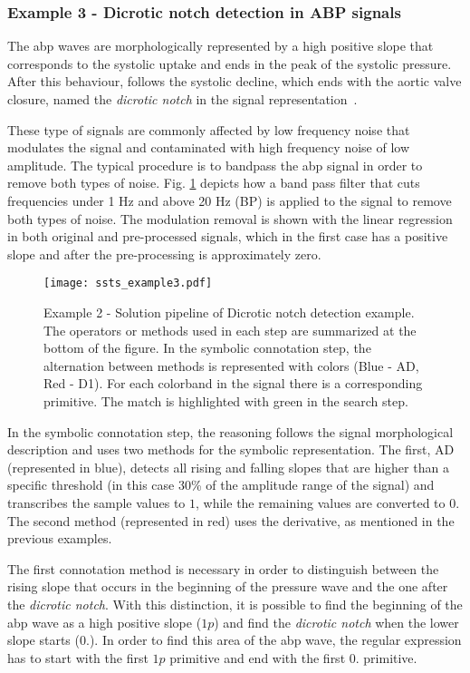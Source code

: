 \subsubsection{Example 3 - Dicrotic notch detection in ABP signals}

The \gls{abp} waves are morphologically represented by a high positive slope that corresponds to the systolic uptake and ends in the peak of the systolic pressure. After this behaviour, follows the systolic decline, which ends with the aortic valve closure, named the \textit{dicrotic notch} in the signal representation~\cite{abpSignal}.
\par
These type of signals are commonly affected by low frequency noise that modulates the signal and contaminated with high frequency noise of low amplitude. The typical procedure is to bandpass the \gls{abp} signal in order to remove both types of noise. Fig. \ref{fig:Exercise3} depicts how a band pass filter that cuts frequencies under 1 Hz and above 20 Hz (BP) is applied to the signal to remove both types of noise. The modulation removal is shown with the linear regression in both original and pre-processed signals, which in the first case has a positive slope and after the pre-processing is approximately zero.

\begin{figure}[H]
  \centering
      \texttt{[image: ssts\_example3.pdf]}
  \caption{Example 2 - Solution pipeline of Dicrotic notch detection example. The operators or methods used in each step are summarized at the bottom of the figure. In the symbolic connotation step, the alternation between methods is represented with colors (Blue - AD, Red - D1). For each colorband in the signal there is a corresponding primitive. The match is highlighted with green in the search step.}
  \label{fig:Exercise3}
\end{figure}

In the symbolic connotation step, the reasoning follows the signal morphological description and uses two methods for the symbolic representation. The first, AD (represented in blue), detects all rising and falling slopes that are higher than a specific threshold (in this case 30\% of the amplitude range of the signal) and transcribes the sample values to $1$, while the remaining values are converted to $0$. The second method (represented in red) uses the derivative, as mentioned in the previous examples.
\par
The first connotation method is necessary in order to distinguish between the rising slope that occurs in the beginning of the pressure wave and the one after the \textit{dicrotic notch}. With this distinction, it is possible to find the beginning of the \gls{abp} wave as a high positive slope ($1p$) and find the \textit{dicrotic notch} when the lower slope starts ($0.$). In order to find this area of the \gls{abp} wave, the regular expression has to start with the first $1p$ primitive and end with the first $0.$ primitive. 

